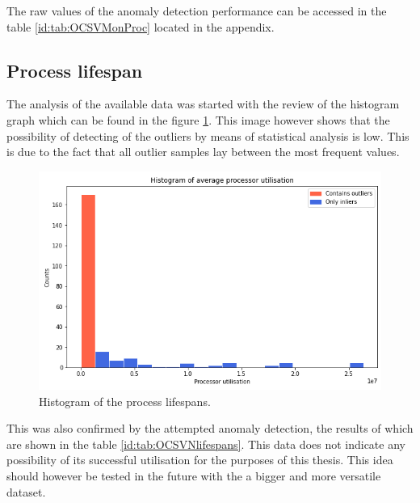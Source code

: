 \documentclass[a4paper,twoside,12pt]{book}
\begin{document}
The raw values of the anomaly detection performance can be accessed in the table \ref{id:tab:OCSVMonProc} located in the 
appendix. 

\subsection{Process lifespan}
The analysis of the available data was started with the review of the histogram graph which can be found in the 
figure \ref{fig:lifespanHist}. This image however shows that the possibility of detecting of the outliers by means of statistical
analysis is low. This is due to the fact that all outlier samples lay between the most frequent values.

\begin{figure}
	\centering
	\includegraphics[scale=0.9]{images/LifespanHist}
	\caption{Histogram of the process lifespans.}
	\label{fig:lifespanHist}
 \end{figure}

This was also confirmed by the attempted anomaly detection, the results of which are shown in the table \ref{id:tab:OCSVNlifespans}. 
This data does not indicate any possibility of its successful utilisation for the purposes of this thesis. This idea should however
be tested in the future with the a bigger and more versatile dataset.
\end{document}
